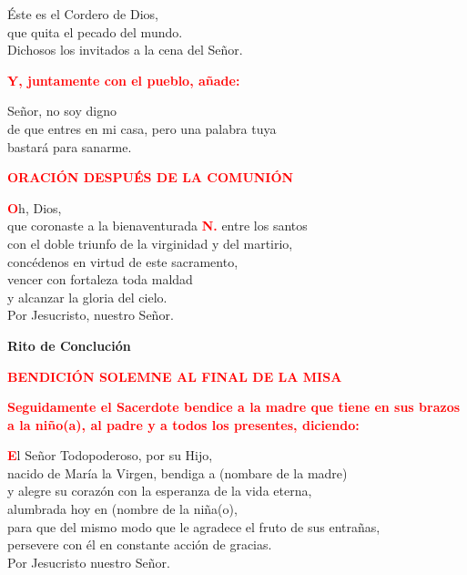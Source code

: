 \documentclass[12pt, letterpaper]{report}
\begin{document}
\Large \'Este es el Cordero de Dios,\\
que quita el pecado del mundo.\\
Dichosos los invitados a la cena del Se\~nor. \newline


\large{\bfseries \textcolor{red}{Y, juntamente con el pueblo, a\~nade:}}\newline

\Large Se\~nor, no soy digno\\
de que entres en mi casa,
pero una palabra tuya\\
bastar\'a para sanarme.\newline

\Large {\bfseries \textcolor{red}{ORACI\'ON DESPU\'ES DE LA COMUNI\'ON}}

\lettrine[lines=1]{\bfseries \textcolor{red}{O}}{}\Large h, Dios, \\
que coronaste a la bienaventurada {\bfseries \textcolor{red}{N.}} entre los santos \\
con el doble triunfo de la virginidad y del martirio, \\
conc\'edenos en virtud de este sacramento, \\
vencer con fortaleza toda maldad \\
y alcanzar la gloria del cielo. \\
Por Jesucristo, nuestro Se\~nor.



\begin{center}
\Huge {\bfseries Rito de Concluci\'on}
\end{center}

\Large {\bfseries \textcolor{red}{BENDICI\'ON SOLEMNE AL FINAL DE LA MISA}} \newline

\large{\bfseries \textcolor{red}{Seguidamente el Sacerdote bendice a la madre que tiene en sus brazos a la ni\~no(a), al padre y a todos los presentes, diciendo:}}\newline

\lettrine[lines=1]{\bfseries \textcolor{red}{E}}{}\Large l Se\~nor Todopoderoso, por su Hijo, \\
nacido de Mar\'ia la Virgen, bendiga a (nombare de la madre) \\
y alegre su coraz\'on con la esperanza de la vida eterna, \\
alumbrada hoy en (nombre de la ni\~na(o), \\
para que del mismo modo que le agradece el fruto de sus entra\~nas, \\ persevere con \'el en constante acci\'on de gracias. \\
Por Jesucristo nuestro Se\~nor. \newline
\end{document}
